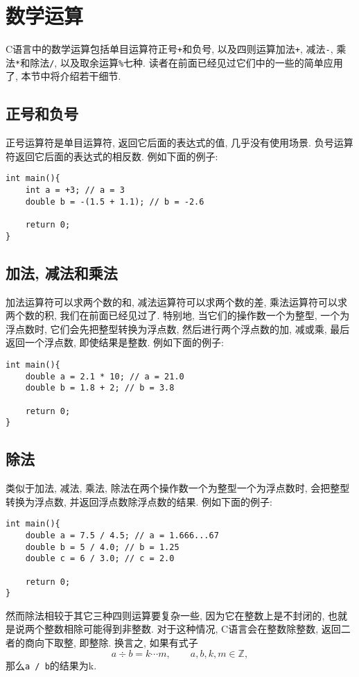     \section{数学运算}
        C语言中的数学运算包括单目运算符正号\texttt{+}和负号, 以及四则运算加法\texttt{+}, 减法\texttt{-}, 乘法\texttt{*}和除法\texttt{/}, 以及取余运算\texttt{\%}七种. 读者在前面已经见过它们中的一些的简单应用了, 本节中将介绍若干细节.

        \subsection*{正号和负号}
            正号运算符是单目运算符, 返回它后面的表达式的值, 几乎没有使用场景. 负号运算符返回它后面的表达式的相反数. 例如下面的例子:
\begin{lstlisting}
int main(){
    int a = +3; // a = 3
    double b = -(1.5 + 1.1); // b = -2.6

    return 0;
}
\end{lstlisting}

        \subsection*{加法, 减法和乘法}
            加法运算符可以求两个数的和, 减法运算符可以求两个数的差, 乘法运算符可以求两个数的积, 我们在前面已经见过了. 特别地, 当它们的操作数一个为整型, 一个为浮点数时, 它们会先把整型转换为浮点数, 然后进行两个浮点数的加, 减或乘, 最后返回一个浮点数, 即使结果是整数. 例如下面的例子:
\begin{lstlisting}
int main(){
    double a = 2.1 * 10; // a = 21.0
    double b = 1.8 + 2; // b = 3.8

    return 0;
}
\end{lstlisting}

        \subsection*{除法}
            类似于加法, 减法, 乘法, 除法在两个操作数一个为整型一个为浮点数时, 会把整型转换为浮点数, 并返回浮点数除浮点数的结果. 例如下面的例子:
\begin{lstlisting}
int main(){
    double a = 7.5 / 4.5; // a = 1.666...67
    double b = 5 / 4.0; // b = 1.25
    double c = 6 / 3.0; // c = 2.0
    
    return 0;
}
\end{lstlisting}

            然而除法相较于其它三种四则运算要复杂一些, 因为它在整数上是不封闭的, 也就是说两个整数相除可能得到非整数. 对于这种情况, C语言会在整数除整数, 返回二者的商向下取整, 即整除. 换言之, 如果有式子
                \[ a \div b = k \cdots m, \qquad a, b, k, m \in \mathbb{Z},\]
            那么\texttt{a / b}的结果为k.

